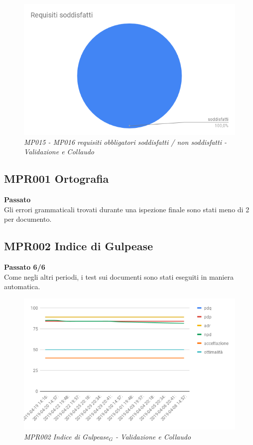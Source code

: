 \begin{figure} [H]
    \centering
	\includegraphics[scale=0.5]{./images/RA_obsod.png}
    \caption{\textit{MP015 - MP016  requisiti obbligatori soddisfatti / non soddisfatti - Validazione e Collaudo}}
\end{figure}

\subsection{MPR001 Ortografia}
\textbf{Passato}\\
Gli errori grammaticali trovati durante una ispezione finale sono stati meno di 2 per documento.
\subsection{MPR002 Indice di Gulpease}
\textbf{Passato 6/6}\\
Come negli altri periodi, i test sui documenti sono stati eseguiti in maniera automatica.
\begin{figure} [H]
    \centering
	\includegraphics[scale=0.5]{./images/RA_gul.png}
    \caption{\textit{MPR002 \textit{Indice di Gulpease$_{G}$} - Validazione e Collaudo}}
\end{figure}
